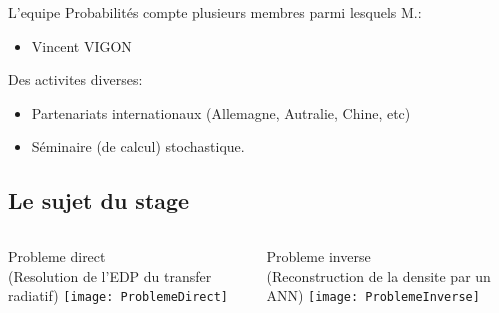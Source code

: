 \begin{frame}
	L'equipe Probabilités compte plusieurs membres parmi lesquels M.: %
	\begin{itemize}
		\item Vincent VIGON
  \end{itemize}

  \pause
  Des activites diverses:
	\begin{itemize}
		\item Partenariats internationaux (Allemagne, Autralie, Chine, etc)  %
		\item Séminaire (de calcul) stochastique.  %
  \end{itemize}


\end{frame}

\subsection{Le sujet du stage}

\begin{frame}

\begin{columns}
 \begin{column}{0.5\textwidth}
  \centering
    Probleme direct \\ (\scriptsize Resolution de l'EDP du transfer radiatif)
      \texttt{[image: ProblemeDirect]}       
  \end{column}
 \pause
 \begin{column}{0.5\textwidth}
    \centering
    Probleme inverse \\ (\scriptsize Reconstruction de la densite par un ANN)
      \texttt{[image: ProblemeInverse]}       
 \end{column}
\end{columns}

\end{frame}

